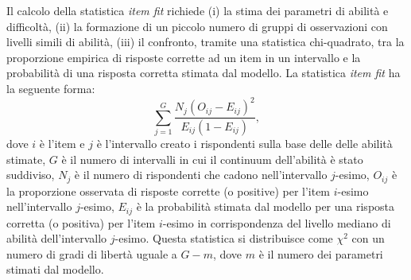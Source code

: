 Il calcolo della statistica  \emph{item fit} richiede (i) la stima dei parametri di abilità e difficoltà, (ii) la formazione di un piccolo numero di gruppi di osservazioni con livelli simili di abilità, (iii) il confronto, tramite una statistica chi-quadrato, tra la proporzione empirica di risposte corrette ad un item in un intervallo e la probabilità di una risposta corretta stimata dal modello. 
La statistica \emph{item fit} ha la seguente forma:
\begin{equation}
\sum_{j=1}^G  \frac{N_j(O_{ij}-E_{ij})^2}{E_{ij}(1-E_{ij})},
\end{equation}
\noindent dove $i$ è l'item e $j$ è l'intervallo creato i rispondenti sulla base delle delle abilità stimate, $G$ è il numero di intervalli in cui il continuum dell'abilità è stato suddiviso, $N_j$ è il numero di rispondenti che cadono nell'intervallo $j$-esimo, $O_{ij}$ è la proporzione osservata di risposte corrette (o positive) per l'item $i$-esimo nell'intervallo $j$-esimo,  $E_{ij}$ è la probabilità stimata dal modello per una risposta corretta (o positiva) per l'item $i$-esimo in corrispondenza del livello mediano di abilità dell'intervallo $j$-esimo. 
Questa statistica si distribuisce come $\chi^2$ con un numero di
gradi di libertà uguale a $G-m$, dove $m$ è il numero dei parametri
stimati dal modello.





